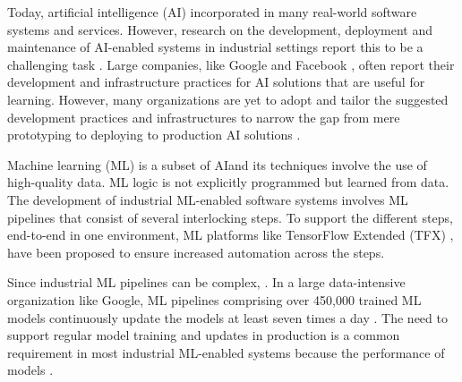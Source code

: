 Today, artificial intelligence (AI) \DIFdelbegin {}\DIFdelend \DIFaddbegin {}\DIFaddend incorporated in many real-world software systems and services. However, research on the development, deployment and maintenance of AI-enabled systems in industrial settings report this to be a challenging task \cite{Sculley2015, Lwakatare2019}. Large companies, like Google \cite{Baylor2017} and Facebook \cite{Hazelwood2018Facebook}, often report their development and infrastructure practices for AI solutions that are useful for learning. However, many organizations are yet to adopt and tailor the suggested development practices and infrastructures to narrow the gap from mere prototyping to deploying to production AI solutions \cite{Serban2020Practices}. 

Machine learning (ML) is a subset of AI\DIFaddbegin \DIFadd{, }\DIFaddend and its techniques involve the use of high-quality data. \DIFdelbegin {}\DIFdelend ML logic is not explicitly programmed but  \DIFdelbegin {}\DIFdelend learned from data. The development of industrial ML-enabled software systems involves ML pipelines that consist of several interlocking steps. To support the different steps, end-to-end in one environment, ML platforms like TensorFlow Extended (TFX) \cite{Baylor2017}, have been proposed to ensure increased automation across the steps.

Since industrial ML pipelines can be complex, \DIFdelbegin {}\DIFdelend \DIFaddbegin {}\DIFaddend . In a large data-intensive organization \DIFdelbegin \DIFdel{, }\DIFdelend like Google, \DIFdelbegin {}\DIFdelend \DIFaddbegin {} ML pipelines comprising \DIFdelbegin {}\DIFdelend over 450,000 trained ML models continuously update the models at least seven times a day \cite{Doris2021MLPipelines}. %
The need to support regular model training and updates in production is a common requirement in most industrial ML-enabled systems because
\DIFdelbegin {}\DIFdelend %
the performance of models \DIFdelbegin {}\DIFdelend \DIFaddbegin {}\DIFaddend \cite{Sculley2015}.


